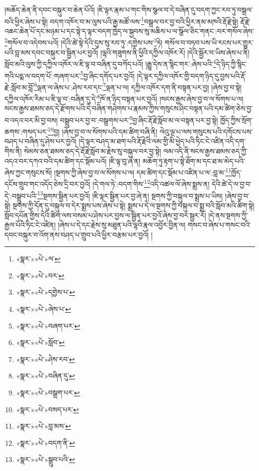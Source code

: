 །མཆོད་ཆེན་ནི་དབང་བསྐུར་བ་ཆེན་པོའོ། །ཇི་ལྟར་རྣམ་པ་གང་གིས་སྩལ་བ་དེ་བཞིན་དུ་བདག་ཀྱང་རབ་ཏུ་བསྒྲལ་བའི་ཕྱིར་ཞེས་པ་སྟེ། བདག་འཁོར་བ་མ་ལུས་པའི་རྒྱ་མཚོ་ལས་\footnote{«སྣར་»«པེ་»ལ་}བསྒྲལ་བར་བྱ་བའི་ཕྱིར་ནམ་མཁའི་རྡོ་རྗེ་སྟེ། རྡོ་རྗེ་འཆང་ཆེན་པོ་དང་མཉམ་པ་དང་སྟེ་ད་ལྟར་བདག་ཁྱེད་ལ་སྐྱབས་སུ་མཆིས་པ་ལ་སྩོལ་ཅིང་གནང་:བར་གསོལ་ཞེས་\footnote{«སྣར་»«པེ་»བར་}གསོལ་བ་འདེབས་པའོ། །དེའི་ཚེ་སྟེ་དེའི་དུས་སུ་རབ་ཏུ་:དགྱེས་པས་\footnote{«སྣར་»«པེ་»དགྱེས་པ་}ཏེ། གསོལ་བ་བཏབ་པས་ཡི་རངས་པར་གྱུར་པའི་བླ་མས་དབང་བསྐུར་བ་སྦྱིན་པར་བྱའོ། །ལྷའི་གཟུགས་ནི་ཕྱིའི་དཀྱིལ་འཁོར་རོ། །དེའི་སྦྱོར་བ་ཡིས་ཞེས་པ་ནི། སློབ་མའི་ལུས་ཀྱི་དཀྱིལ་འཁོར་ལ་ཇི་ལྟ་བ་བཞིན་དུ་བཀོད་པའོ། །རྒྱུ་དེས་ན་སྙིང་གར་:ཞེས་པའི་\footnote{«སྣར་»«པེ་»ཞེས་པ་}དེ་ཉིད་ཀྱི་སྙིང་གའི་པདྨ་ལ་བདག་པོ་:གཞག་པར་\footnote{«སྣར་»«པེ་»བཞག་པར་}བྱ་ཞིང་དགོད་པར་བྱའོ། །དེ་ལྟར་དཀྱིལ་འཁོར་གྱི་བདག་ཉིད་དུ་བྱས་པའི་རྡོ་རྗེ་:སློབ་མ་བློ་\footnote{«སྣར་»«པེ་»སློབ་}ལྡན་ལ་ཞེས་པ་:ཤེས་རབ་དང་\footnote{«སྣར་»«པེ་»ཤེས་རབ་}ལྡན་པ་ལ། དཀྱིལ་འཁོར་དག་ནི་བསྟན་པར་བྱ། །ཞེས་བྱ་བ་སྟེ། དཀྱིལ་འཁོར་རིམ་པ་ཇི་ལྟ་བ་:བཞིན་དུ་དེ་\footnote{«སྣར་»«པེ་»བཞིན་དུ་}ཁོ་ན་ཉིད་བསྟན་པར་བྱའོ། །སངས་རྒྱས་ཞེས་བྱ་བ་ལ་སོགས་པ་ལ། སངས་རྒྱས་ཐམས་ཅད་དེ་རྫོགས་པའི་དེ་བཞིན་གཤེགས་པ་རྣམས་ཀྱིས་གསུངས་ཤིང་བསྟན་པའི་དམ་ཚིག་ཅེས་བྱ་བ་འདའ་བར་མི་བྱ་བས། བསྒྲུབ་པར་བྱ་བ་:བསྒྲགས་པར་\footnote{«སྣར་»«པེ་»བསྒྲག་པར་}བྱ་ཞིང་རྡོ་རྗེ་སློབ་མ་ལ་བསྟན་པར་བྱ་སྟེ། ཁྱོད་ཀྱིས་སྲོག་ཆགས་:གསད་པར་\footnote{«སྣར་»«པེ་»བསད་པར་}བྱ། །ཞེས་བྱ་བ་ལ་སོགས་པའི་དམ་ཚིག་བཞི་ནི། ལེའུ་ལྔ་པ་ལས་གསུངས་པའི་དགོངས་པས་བཤད་པ་བཞིན་དུ་ཤེས་པར་བྱའོ། །དེ་ལྟར་བཤད་མ་ཐག་པའི་རྡོ་རྗེའི་ལམ་གྱི་མི་ཕྱེད་པའི་ཏིང་ངེ་འཛིན་འདི་དག་གིས་ནི། སེམས་ཅན་ཐམས་ཅད་དེ་རྡོ་རྗེ་སློབ་མ་རྗེས་སུ་བསྐུལ་བར་བྱ་སྟེ། ལམ་འདི་ནི་སངས་རྒྱས་ཐམས་ཅད་ཀྱི་འདའ་བར་དཀའ་བའི་དམ་ཚིག་དང་སྡོམ་པའོ། །ཇི་ལྟ་བུ་ཞེ་ན། མཆོག་ཏུ་རྟག་པ་སྟེ་ཐོག་མ་དང་ཐ་མ་མེད་པའི་ཞེས་ཀྱང་གསུངས་སོ། །སྔགས་ཀྱི་ཞེས་བྱ་བ་ལ་སོགས་པ་ལ། དམ་ཚིག་དང་སྡོམ་པ་འཛིན་པ་ལ་:བླ་མ་\footnote{«སྣར་»«པེ་»བླ་མས་}ཁྱོད་དངོས་གྲུབ་གང་འདོད་ཅེས་དྲི་བར་བྱའོ། །དེ་གལ་ཏེ་:བདག་གིས་\footnote{«སྣར་»«པེ་»བདག་ནི་}འདི་འཚལ་ལོ་ཞེས་སྨྲས་ན། དེའི་ཚེ་དེ་ལ་བྱ་བ་དེ་:བསྒྲུབ་པའི་\footnote{«སྣར་»«པེ་»སྒྲུབ་པའི་}སྔགས་སྦྱིན་པར་བྱའོ། །ཇི་ལྟར་སྦྱིན་པར་བྱ་ཞེ་ན། སྔགས་ཀྱི་བསྐུལ་བ་སྨྲས་པ་ཡིས། །ཞེས་བྱ་བ་སྟེ། སྔགས་ཀྱི་དོན་དུ་བསྐུལ་བ་དེར་སྨྲས་པས་ཞེས་པ་སྟེ། སྨྲས་པ་དེ་ལ་སྔགས་ཀྱི་བསྐུལ་བ་སྨྲ་བའི་སློབ་མའི་ཚིག་སྟེ། སློབ་དཔོན་གྱིས་དེའི་ཚིག་ལས་བསམ་པ་ཤེས་པར་བྱས་ལ་སྦྱིན་པར་བྱའོ་ཞེས་བྱ་བར་སྦྱར་རོ། །དེ་ནས་སྔགས་ཀྱི་རྒྱལ་པོའི་ཏིང་ངེ་འཛིན། །ཞེས་པ་དེ་དང་རྗེས་སུ་མཐུན་པའི་ལྷའི་རྣལ་འབྱོར་བྱིན་ལ། གསང་བ་ཞེས་པ་གསང་བའི་དབང་བསྐུར་བ་འོག་ནས་བཤད་པ་གྲུབ་པའི་ཕྱིར་བརྩམ་པར་བྱའོ། །
